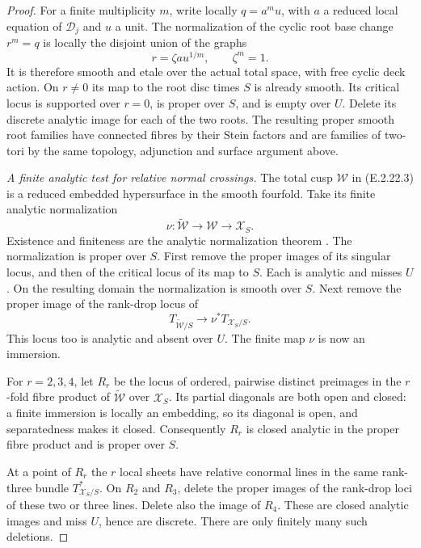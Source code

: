 \begin{proof}
For a finite multiplicity $m$, write locally
$q=a^m u$, with $a$ a reduced local equation
of $\mathcal D_j$ and $u$ a unit.  The normalization
of the cyclic root base change $r^m=q$ is
locally the disjoint union of the graphs
\[
 r=\zeta a u^{1/m},\qquad \zeta^m=1.
\]
It is therefore smooth and etale over the
actual total space, with free cyclic deck
action.  On $r\ne0$ its map to the root
disc times $S$ is already smooth.  Its
critical locus is supported over $r=0$,
is proper over $S$, and is empty over $U$.
Delete its discrete analytic image for
each of the two roots.  The resulting
proper smooth root families have connected
fibres by their Stein factors and are
families of two-tori by the same topology,
adjunction and surface argument above.

\emph{A finite analytic test for relative normal crossings.}
The total cusp $\mathcal W$ in (E.2.22.3)
is a reduced embedded hypersurface in
the smooth fourfold.  Take its finite
analytic normalization
\[
 \nu:\widetilde{\mathcal W}\longrightarrow
       \mathcal W\longrightarrow\mathcal X_S.
\]
Existence and finiteness are the analytic
normalization theorem
\cite[Chapter~II, Definition~7.9 and Theorem~7.12]{Demailly2012E}.
The normalization is proper over $S$.
First remove the proper images of its
singular locus, and then of the critical
locus of its map to $S$.  Each is analytic
and misses $U$.  On the resulting domain
the normalization is smooth over $S$.
Next remove the proper image of the
rank-drop locus of
\[
 T_{\widetilde{\mathcal W}/S}
       \longrightarrow\nu^*T_{\mathcal X_S/S}.
\]
This locus too is analytic and absent over
$U$.  The finite map $\nu$ is now an immersion.

For $r=2,3,4$, let $R_r$ be the locus
of ordered, pairwise distinct preimages
in the $r$-fold fibre product of
$\widetilde{\mathcal W}$ over $\mathcal X_S$.
Its partial diagonals are both open and
closed: a finite immersion is locally
an embedding, so its diagonal is open,
and separatedness makes it closed.
Consequently $R_r$ is closed analytic
in the proper fibre product and is
proper over $S$.

At a point of $R_r$ the $r$ local sheets
have relative conormal lines in the same
rank-three bundle $T^*_{\mathcal X_S/S}$.
On $R_2$ and $R_3$, delete the proper
images of the rank-drop loci of these
two or three lines.  Delete also the
image of $R_4$.  These are closed
analytic images and miss $U$, hence
are discrete.  There are only finitely
many such deletions.


\end{proof}

